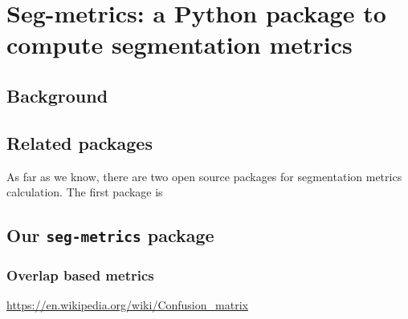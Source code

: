 \graphicspath{{chapter6/figures/}}
\chapter{Seg-metrics: a Python package to compute segmentation metrics}
\label{chap:6}



\ThumbIndexShow

\begin{abstract}

\end{abstract}

\clearpage

\section{Background}

\section{Related packages}
As far as we know, there are two open source packages for segmentation metrics calculation. The first package is 

\section{Our \texttt{seg-metrics} package}

\subsection{Overlap based metrics}
    
\url{https://en.wikipedia.org/wiki/Confusion_matrix}

